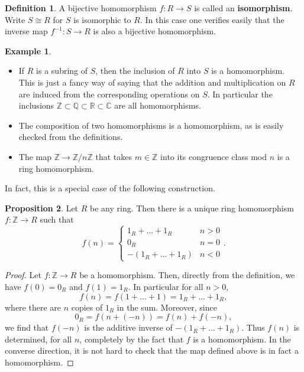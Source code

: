 \documentclass{article}
\newcommand{\Z}{\mathbb{Z}}
\newcommand{\Q}{\mathbb{Q}}
\newcommand{\R}{\mathbb{R}}
\newcommand{\C}{\mathbb{C}}
\newcommand{\rb}[1]{\left( #1 \right)}
\theoremstyle{definition}\newtheorem{definition}{Definition}[subsection]
\theoremstyle{definition}\newtheorem{remark}[definition]{Remark}
\theoremstyle{definition}\newtheorem*{example}{Example}
\theoremstyle{definition}\newtheorem*{note}{Note}
\newtheorem{proposition}[definition]{Proposition}
\begin{document}
\begin{definition}
A bijective homomorphism $ f : R \to S $ is called an \textbf{isomorphism}. Write $ S \cong R $ for $ S $ is isomorphic to $ R $. In this case one verifies easily that the inverse map $ f^{-1} : S \to R $ is also a bijective homomorphism.
\end{definition}

\begin{example}
\hfill
\begin{itemize}
\item If $ R $ is a subring of $ S $, then the inclusion of $ R $ into $ S $ is a homomorphism. This is just a fancy way of saying that the addition and multiplication on $ R $ are induced from the corresponding operations on $ S $. In particular the inclusions $ \Z \subset \Q \subset \R \subset \C $ are all homomorphisms.
\item The composition of two homomorphisms is a homomorphism, as is easily checked from the definitions.
\item The map $ \Z \to \Z / n\Z $ that takes $ m \in \Z $ into its congruence class mod $ n $ is a ring homomorphism.
\end{itemize}
\end{example}

In fact, this is a special case of the following construction.

\begin{proposition}
Let $ R $ be any ring. Then there is a unique ring homomorphism $ f : \Z \to R $ such that
$$ f\rb{n} = \begin{cases}
1_R + \dots + 1_R & n > 0 \\
0_R & n = 0 \\
-\rb{1_R + \dots + 1_R} & n < 0
\end{cases}. $$
\end{proposition}

\begin{proof}
Let $ f : \Z \to R $ be a homomorphism. Then, directly from the definition, we have $ f\rb{0} = 0_R $ and $ f\rb{1} = 1_R $. In particular for all $ n > 0 $,
$$ f\rb{n} = f\rb{1 + \dots + 1} = 1_R + \dots + 1_R, $$
where there are $ n $ copies of $ 1_R $ in the sum. Moreover, since
$$ 0_R = f\rb{n + \rb{-n}} = f\rb{n} + f\rb{-n}, $$
we find that $ f\rb{-n} $ is the additive inverse of $ -\rb{1_R + \dots + 1_R} $. Thus $ f\rb{n} $ is determined, for all $ n $, completely by the fact that $ f $ is a homomorphism. In the converse direction, it is not hard to check that the map defined above is in fact a homomorphism.
\end{proof}
\end{document}
